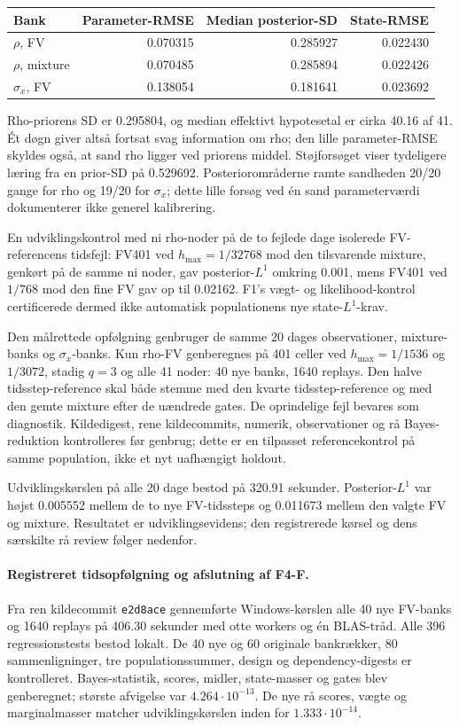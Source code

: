 \begin{center}
\begin{tabular}{@{}lrrr@{}}
\toprule
Bank & Parameter-RMSE & Median posterior-SD & State-RMSE\\
\midrule
\(\rho\), FV & 0.070315 & 0.285927 & 0.022430\\
\(\rho\), mixture & 0.070485 & 0.285894 & 0.022426\\
\(\sigma_x\), FV & 0.138054 & 0.181641 & 0.023692\\
\bottomrule
\end{tabular}
\end{center}
Rho-priorens SD er 0.295804, og median effektivt hypotesetal er cirka
40.16 af 41. Ét døgn giver altså fortsat svag information om rho;
den lille parameter-RMSE skyldes også, at sand rho ligger ved priorens middel.
Støjforsøget viser tydeligere læring fra en prior-SD på 0.529692.
Posteriorområderne ramte sandheden 20/20 gange for rho og 19/20 for
\(\sigma_x\); dette lille forsøg ved én sand parameterværdi dokumenterer
ikke generel kalibrering.

En udviklingskontrol med ni rho-noder på de to fejlede dage isolerede
FV-referencens tidsfejl: FV401 ved \(h_{\max}=1/32768\) mod den tilsvarende
mixture, genkørt på de samme ni noder, gav posterior-\(L^1\) omkring 0.001,
mens FV401 ved \(1/768\)
mod den fine FV gav op til 0.02162. F1's vægt- og likelihood-kontrol
certificerede dermed ikke automatisk populationens nye state-\(L^1\)-krav.

Den målrettede opfølgning genbruger de samme 20 dages observationer,
mixture-banks og \(\sigma_x\)-banks. Kun rho-FV genberegnes på 401 celler
ved \(h_{\max}=1/1536\) og \(1/3072\), stadig \(q=3\) og alle 41 noder:
40 nye banks, 1640 replays. Den halve tidsstep-reference skal både stemme
med den kvarte tidsstep-reference og med den gemte mixture efter de
uændrede gates. De oprindelige fejl bevares som diagnostik. Kildedigest,
rene kildecommits, numerik, observationer og rå Bayes-reduktion kontrolleres
før genbrug; dette er en tilpasset referencekontrol på samme population,
ikke et nyt uafhængigt holdout.

Udviklingskørslen på alle 20 dage bestod på 320.91 sekunder.
Posterior-\(L^1\) var højst 0.005552 mellem de to nye FV-tidssteps og
0.011673 mellem den valgte FV og mixture. Resultatet er udviklingsevidens;
den registrerede kørsel og dens særskilte rå review følger nedenfor.

\paragraph{Registreret tidsopfølgning og afslutning af F4-F.}
Fra ren kildecommit \texttt{e2d8ace} gennemførte Windows-kørslen alle
40 nye FV-banks og 1640 replays på 406.30 sekunder med otte workers og
én BLAS-tråd. Alle 396 regressionstests bestod lokalt. De 40 nye og
60 originale bankrækker, 80 sammenligninger, tre populationssummer,
design og dependency-digests er kontrolleret. Bayes-statistik, scores,
midler, state-masser og gates blev genberegnet; største afvigelse var
\(4.264\cdot10^{-13}\). De nye rå scores, vægte og marginalmasser
matcher udviklingskørslen inden for \(1.333\cdot10^{-14}\).

